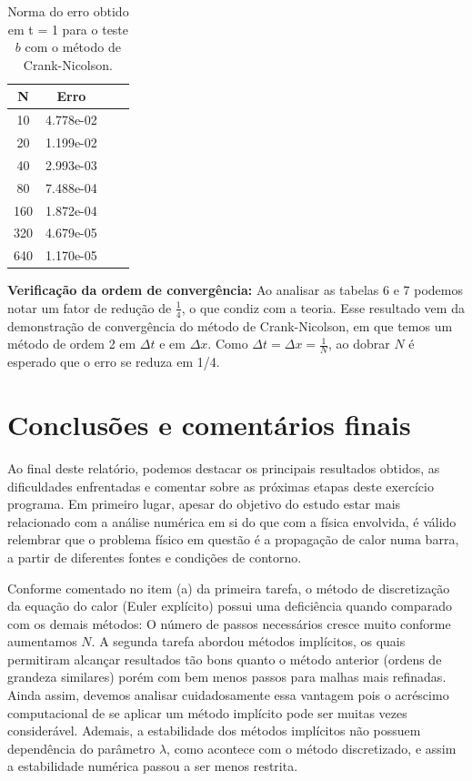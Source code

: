 \documentclass[a4paper, 12pt]{article}
\begin{document}
\begin{table}[!h]
    \centering
    \begin{tabular}{|c|c|c|c|}
    \hline                               %
    N & Erro \\
    \hline
    10  & 4.778e-02  \\
    20  & 1.199e-02  \\
    40  & 2.993e-03  \\
    80  & 7.488e-04  \\
    160 & 1.872e-04  \\
    320 & 4.679e-05  \\
    640 & 1.170e-05  \\
    \hline
    \end{tabular}
    \caption{Norma do erro obtido em t = 1 para o teste $b$ com o método de Crank-Nicolson.}
\end{table}

\textbf{Verificação da ordem de convergência:} Ao analisar as tabelas 6 e 7 podemos notar um fator de redução de $\frac{1}{4}$, o que condiz com a teoria. Esse resultado vem da demonstração de convergência do método de Crank-Nicolson, em que temos um método de ordem 2 em $\Delta t$ e em $\Delta x$. Como $\Delta t = \Delta x = \frac{1}{N}$, ao dobrar $N$ é esperado que o erro se reduza em 1/4. 

\section{Conclusões e comentários finais}

Ao final deste relatório, podemos destacar os principais resultados obtidos, as dificuldades enfrentadas e comentar sobre as próximas etapas deste exercício programa. Em primeiro lugar, apesar do objetivo do estudo estar mais relacionado com a análise numérica em si do que com a física envolvida, é válido relembrar que o problema físico em questão é a propagação de calor numa barra, a partir de diferentes fontes e condições de contorno.

Conforme comentado no item (a) da primeira tarefa, o método de discretização da equação do calor (Euler explícito) possui uma deficiência quando comparado com os demais métodos: O número de passos necessários cresce muito conforme aumentamos $N$. A segunda tarefa abordou métodos implícitos, os quais permitiram alcançar resultados tão bons quanto o método anterior (ordens de grandeza similares) porém com bem menos passos para malhas mais refinadas. Ainda assim, devemos analisar cuidadosamente essa vantagem pois o acréscimo computacional de se aplicar um método implícito pode ser muitas vezes considerável. Ademais, a estabilidade dos métodos implícitos não possuem dependência do parâmetro $\lambda$, como acontece com o método discretizado, e assim a estabilidade numérica passou a ser menos restrita.
\end{document}
